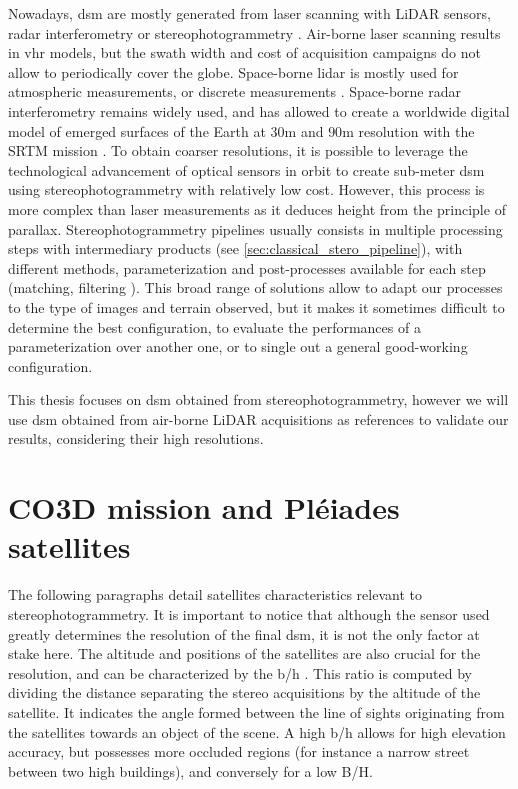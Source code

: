 Nowadays, \acrshort{dsm} are mostly generated from laser scanning with LiDAR sensors, radar interferometry or stereophotogrammetry \cite{youssefi_cars_2020}. Air-borne laser scanning results in \acrfull{vhr} models, but the swath width and cost of acquisition campaigns do not allow to periodically cover the globe. Space-borne \acrshort{lidar} is mostly used for atmospheric measurements, or discrete measurements \cite{fouladinejad_history_2019}. Space-borne radar interferometry remains widely used, and has allowed to create a worldwide digital model of emerged surfaces of the Earth at $30$m and $90$m resolution with the SRTM mission \cite{farr_shuttle_2007}. To obtain coarser resolutions, it is possible to leverage the technological advancement of optical sensors in orbit to create sub-meter \acrshort{dsm} using stereophotogrammetry with relatively low cost. However, this process is more complex than laser measurements as it deduces height from the principle of parallax. Stereophotogrammetry pipelines usually consists in multiple processing steps with intermediary products (see \ref{sec:classical_stero_pipeline}), with different methods, parameterization and post-processes available for each step (\eg matching, filtering \etc). This broad range of solutions allow to adapt our processes to the type of images and terrain observed, but it makes it sometimes difficult to determine the best configuration, to evaluate the performances of a parameterization over another one, or to single out a general good-working configuration. 

This thesis focuses on \acrshort{dsm} obtained from stereophotogrammetry, however we will use \acrshort{dsm} obtained from air-borne LiDAR acquisitions as references to validate our results, considering their high resolutions.

\section{CO3D mission and Pléiades satellites}
The following paragraphs detail satellites characteristics relevant to stereophotogrammetry. It is important to notice that although the sensor used greatly determines the resolution of the final \acrshort{dsm}, it is not the only factor at stake here. The altitude and positions of the satellites are also crucial for the resolution, and can be characterized by the \acrfull{b/h} . This ratio is computed by dividing the distance separating the stereo acquisitions by the altitude of the satellite. It indicates the angle formed between the line of sights originating from the satellites towards an object of the scene. A high \acrshort{b/h} allows for high elevation accuracy, but possesses more occluded regions (for instance a narrow street between two high buildings), and conversely for a low B/H. 


